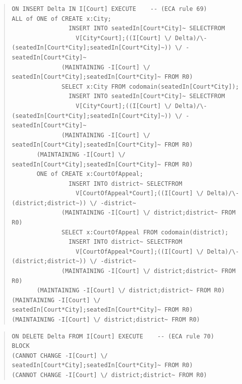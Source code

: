 \documentclass[10pt,a4paper]{report}              %
\theoremstyle{plain}\theorembodyfont{\rmfamily}\newtheorem{definition}{Definition}[section]
\theoremstyle{plain}\theorembodyfont{\rmfamily}\newtheorem{designrule}[definition]{Requirement}
\begin{document}
\begin{quote}
\begin{verbatim}
ON INSERT Delta IN I[Court] EXECUTE    -- (ECA rule 69)
ALL of ONE of CREATE x:City;
                INSERT INTO seatedIn[Court*City]~ SELECTFROM
                  V[City*Court];((I[Court] \/ Delta)/\-(seatedIn[Court*City];seatedIn[Court*City]~)) \/ -seatedIn[Court*City]~
              (MAINTAINING -I[Court] \/ seatedIn[Court*City];seatedIn[Court*City]~ FROM R0)
              SELECT x:City FROM codomain(seatedIn[Court*City]);
                INSERT INTO seatedIn[Court*City]~ SELECTFROM
                  V[City*Court];((I[Court] \/ Delta)/\-(seatedIn[Court*City];seatedIn[Court*City]~)) \/ -seatedIn[Court*City]~
              (MAINTAINING -I[Court] \/ seatedIn[Court*City];seatedIn[Court*City]~ FROM R0)
       (MAINTAINING -I[Court] \/ seatedIn[Court*City];seatedIn[Court*City]~ FROM R0)
       ONE of CREATE x:CourtOfAppeal;
                INSERT INTO district~ SELECTFROM
                  V[CourtOfAppeal*Court];((I[Court] \/ Delta)/\-(district;district~)) \/ -district~
              (MAINTAINING -I[Court] \/ district;district~ FROM R0)
              SELECT x:CourtOfAppeal FROM codomain(district);
                INSERT INTO district~ SELECTFROM
                  V[CourtOfAppeal*Court];((I[Court] \/ Delta)/\-(district;district~)) \/ -district~
              (MAINTAINING -I[Court] \/ district;district~ FROM R0)
       (MAINTAINING -I[Court] \/ district;district~ FROM R0)
(MAINTAINING -I[Court] \/ seatedIn[Court*City];seatedIn[Court*City]~ FROM R0)
(MAINTAINING -I[Court] \/ district;district~ FROM R0)
\end{verbatim}
\end{quote}
\begin{quote}
\begin{verbatim}
ON DELETE Delta FROM I[Court] EXECUTE    -- (ECA rule 70)
BLOCK
(CANNOT CHANGE -I[Court] \/ seatedIn[Court*City];seatedIn[Court*City]~ FROM R0)
(CANNOT CHANGE -I[Court] \/ district;district~ FROM R0)
\end{verbatim}
\end{quote}
\end{document}
